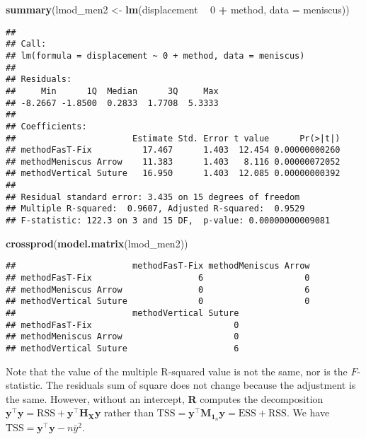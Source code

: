 \documentclass[]{book}
\newenvironment{Shaded}{\begin{snugshade}}{\end{snugshade}}
\newcommand{\DataTypeTok}[1]{\textcolor[rgb]{0.13,0.29,0.53}{#1}}
\newcommand{\DecValTok}[1]{\textcolor[rgb]{0.00,0.00,0.81}{#1}}
\newcommand{\KeywordTok}[1]{\textcolor[rgb]{0.13,0.29,0.53}{\textbf{#1}}}
\newcommand{\NormalTok}[1]{#1}
\newcommand{\OperatorTok}[1]{\textcolor[rgb]{0.81,0.36,0.00}{\textbf{#1}}}
\newcommand{\StringTok}[1]{\textcolor[rgb]{0.31,0.60,0.02}{#1}}
\theoremstyle{definition}
\theoremstyle{definition}
\theoremstyle{definition}
\theoremstyle{remark}
\begin{document}
\begin{Shaded}
\begin{Highlighting}[]
\KeywordTok{summary}\NormalTok{(lmod_men2 <-}\StringTok{ }\KeywordTok{lm}\NormalTok{(displacement }\OperatorTok{~}\StringTok{ }\DecValTok{0} \OperatorTok{+}\StringTok{ }\NormalTok{method, }\DataTypeTok{data =}\NormalTok{ meniscus))}
\end{Highlighting}
\end{Shaded}

\begin{verbatim}
## 
## Call:
## lm(formula = displacement ~ 0 + method, data = meniscus)
## 
## Residuals:
##     Min      1Q  Median      3Q     Max 
## -8.2667 -1.8500  0.2833  1.7708  5.3333 
## 
## Coefficients:
##                       Estimate Std. Error t value      Pr(>|t|)
## methodFasT-Fix          17.467      1.403  12.454 0.00000000260
## methodMeniscus Arrow    11.383      1.403   8.116 0.00000072052
## methodVertical Suture   16.950      1.403  12.085 0.00000000392
## 
## Residual standard error: 3.435 on 15 degrees of freedom
## Multiple R-squared:  0.9607, Adjusted R-squared:  0.9529 
## F-statistic: 122.3 on 3 and 15 DF,  p-value: 0.00000000009081
\end{verbatim}

\begin{Shaded}
\begin{Highlighting}[]
\KeywordTok{crossprod}\NormalTok{(}\KeywordTok{model.matrix}\NormalTok{(lmod_men2))}
\end{Highlighting}
\end{Shaded}

\begin{verbatim}
##                       methodFasT-Fix methodMeniscus Arrow
## methodFasT-Fix                     6                    0
## methodMeniscus Arrow               0                    6
## methodVertical Suture              0                    0
##                       methodVertical Suture
## methodFasT-Fix                            0
## methodMeniscus Arrow                      0
## methodVertical Suture                     6
\end{verbatim}

Note that the value of the multiple R-squared value is not the same, nor is the \(F\)-statistic. The residuals sum of square does not change because the adjustment is the same. However, without an intercept, \textbf{R} computes the decomposition
\(\boldsymbol{y}^\top\boldsymbol{y} = \mathrm{RSS} + \boldsymbol{y}^\top\mathbf{H}_{\mathbf{X}}\boldsymbol{y}\) rather than \(\mathrm{TSS} = \boldsymbol{y}^\top\mathbf{M}_{\mathbf{1}_n}\boldsymbol{y}= \mathrm{ESS}+\mathrm{RSS}\).
We have \(\mathrm{TSS} = \boldsymbol{y}^\top\boldsymbol{y}-n\bar{y}^2\).
\end{document}
